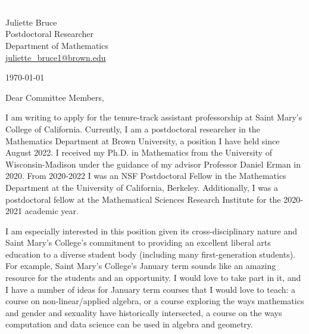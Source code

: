 \documentclass[11pt]{article}
\begin{document}
\section*{}

\noindent
\begin{minipage}{0.99\textwidth}
\begin{minipage}{0.69\textwidth}
\textcolor{white}{.}
\end{minipage}
\begin{minipage}{0.29\textwidth}
{
Juliette Bruce \\
Postdoctoral Researcher \\
Department of Mathematics \\
\href{mailto:juliette\_bruce1@brown.edu}{juliette\_bruce1@brown.edu}
}

\vspace{12pt}
\today
\end{minipage}
\end{minipage}


\vspace{12pt}
\noindent
Dear Committee Members,

I am writing to apply for the tenure-track assistant professorship at Saint Mary's College of California. Currently, I am a postdoctoral researcher in the Mathematics Department at Brown University, a position I have held since August 2022. I received my Ph.D. in Mathematics from the University of Wisconsin-Madison under the guidance of my advisor Professor Daniel Erman in 2020. From 2020-2022 I was an NSF Postdoctoral Fellow in the Mathematics Department at the University of California, Berkeley. Additionally, I was a postdoctoral fellow at the Mathematical Sciences Research Institute for the 2020-2021 academic year.

I am especially interested in this position given its cross-disciplinary nature and Saint Mary's College's commitment to providing an excellent liberal arts education to a diverse student body (including many first-generation students). For example, Saint Mary's College's January term sounds like an amazing resource for the students and an opportunity. I would love to take part  in it, and I have a number of ideas for January term courses that I would love to teach:  a course on non-linear/applied algebra, or a course exploring the ways mathematics and gender and sexuality have historically intersected, a course on the ways computation and data science can be used in algebra and geometry. 
\end{document}
